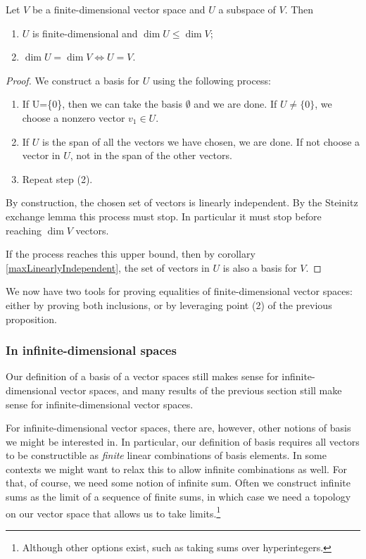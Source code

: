 \begin{proposition} \label{vectorSpaceEquality}
Let $V$ be a finite-dimensional vector space and $U$ a subspace of $V$. Then
\begin{enumerate}
\item $U$ is finite-dimensional and $\dim U \leq \dim V$;
\item $\dim U = \dim V \iff U=V$.
\end{enumerate}
\end{proposition}
\begin{proof}
We construct a basis for $U$ using the following process:
\begin{enumerate}
\item If U=\{0\}, then we can take the basis $\emptyset$ and we are done. If $U\neq \{0\}$, we choose a nonzero vector $v_1 \in U$.
\item If $U$ is the span of all the vectors we have chosen, we are done. If not choose a vector in $U$, not in the span of the other vectors.
\item Repeat step (2).
\end{enumerate}
By construction, the chosen set of vectors is linearly independent. By the Steinitz exchange lemma this process must stop. In particular it must stop before reaching $\dim V$ vectors.

If the process reaches this upper bound, then by corollary \ref{maxLinearlyIndependent}, the set of vectors in $U$ is also a basis for $V$.
\end{proof}
We now have two tools for proving equalities of finite-dimensional vector spaces: either by proving both inclusions, or by leveraging point (2) of the previous proposition.

\subsubsection{In infinite-dimensional spaces}
Our definition of a basis of a vector spaces still makes sense for infinite-dimensional vector spaces, and many results of the previous section still make sense for infinite-dimensional vector spaces.

For infinite-dimensional vector spaces, there are, however, other notions of basis we might be interested in. In particular, our definition of basis requires all vectors to be constructible as \emph{finite} linear combinations of basis elements. In some contexts we might want to relax this to allow infinite combinations as well. For that, of course, we need some notion of infinite sum. Often we construct infinite sums as the limit of a sequence of finite sums, in which case we need a topology on our vector space that allows us to take limits.\footnote{Although other options exist, such as taking sums over hyperintegers.}  

